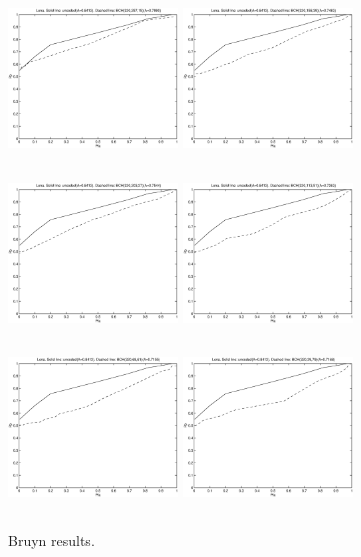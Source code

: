 \documentclass[12pt]{article}
\begin{document}
\begin{figure}[p]
	\includegraphics[height=4.5cm,width=4.5cm]{bruynplot4.eps}
	\includegraphics[height=4.5cm,width=4.5cm]{bruynplot6.eps}
	\includegraphics[height=4.5cm,width=4.5cm]{bruynplot8.eps}
	\includegraphics[height=4.5cm,width=4.5cm]{bruynplot10.eps}
	\includegraphics[height=4.5cm,width=4.5cm]{bruynplot12.eps}
	\includegraphics[height=4.5cm,width=4.5cm]{bruynplot14.eps}
	\caption{Bruyn results.}
\end{figure}
\end{document}
